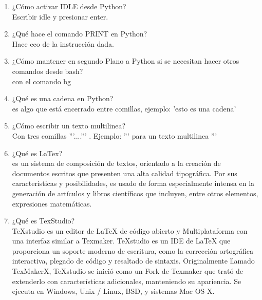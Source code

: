 \documentclass[letterpaper, 12pt, oneside]{article}%
\begin{document}
\begin{enumerate}
    \item¿Cómo activar IDLE desde Python?\\
Escribir idle y presionar enter.

    \item ¿Qué hace el comando PRINT en Python?\\
Hace eco de la instrucción dada.

    \item ¿Cómo mantener en segundo Plano a Python si se necesitan hacer otros comandos desde bash?\\
con el comando bg

    \item ¿Qué es una cadena en Python?\\
es algo que está encerrado entre comillas, ejemplo: 'esto es una cadena'

    \item ¿Cómo escribir un texto multilinea?\\
    Con tres comillas '''....''' . Ejemplo: ''' para un texto multilinea '''
    
    \item ¿Qué es LaTex?\\
 es un sistema de composición de textos, orientado a la creación de documentos escritos que presenten una alta calidad tipográfica. 
Por sus características y posibilidades, es usado de forma especialmente intensa en la generación de artículos y libros científicos que incluyen, entre otros elementos, expresiones matemáticas.

    \item ¿Qué es TexStudio?\\
TeXstudio es un editor de LaTeX de código abierto y Multiplataforma con una interfaz similar a Texmaker.
TeXstudio es un IDE de LaTeX que proporciona un soporte moderno de escritura, como la corrección ortográfica interactiva, plegado de código y resaltado de sintaxis.
Originalmente llamado TexMakerX, TeXstudio se inició como un Fork de Texmaker que trató de extenderlo con características adicionales, manteniendo su apariencia. 
Se ejecuta en Windows, Unix / Linux, BSD, y sistemas Mac OS X.

    
    


\end{enumerate}%
\end{document}
